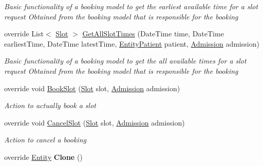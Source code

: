 \begin{DoxyCompactItemize}
\begin{DoxyCompactList}\small\item\em Basic functionality of a booking model to get the earliest available time for a slot request Obtained from the booking model that is responsible for the booking \end{DoxyCompactList}\item 
override List$<$ \hyperlink{class_general_health_care_elements_1_1_booking_models_1_1_slot}{Slot} $>$ \hyperlink{class_general_health_care_elements_1_1_booking_models_1_1_entity_multiple_booking_waiting_list_schedule_aef414867a83fb4397a0fd8d283d0aa21}{Get\+All\+Slot\+Times} (Date\+Time time, Date\+Time earliest\+Time, Date\+Time latest\+Time, \hyperlink{class_general_health_care_elements_1_1_entities_1_1_entity_patient}{Entity\+Patient} patient, \hyperlink{class_general_health_care_elements_1_1_treatment_admission_types_1_1_admission}{Admission} admission)
\begin{DoxyCompactList}\small\item\em Basic functionality of a booking model to get the all available times for a slot request Obtained from the booking model that is responsible for the booking \end{DoxyCompactList}\item 
override void \hyperlink{class_general_health_care_elements_1_1_booking_models_1_1_entity_multiple_booking_waiting_list_schedule_ab6a814da70473ad68a6904e97bf8c45c}{Book\+Slot} (\hyperlink{class_general_health_care_elements_1_1_booking_models_1_1_slot}{Slot} slot, \hyperlink{class_general_health_care_elements_1_1_treatment_admission_types_1_1_admission}{Admission} admission)
\begin{DoxyCompactList}\small\item\em Action to actually book a slot \end{DoxyCompactList}\item 
override void \hyperlink{class_general_health_care_elements_1_1_booking_models_1_1_entity_multiple_booking_waiting_list_schedule_a1795b97a285b4918eb1890ccacc7c82d}{Cancel\+Slot} (\hyperlink{class_general_health_care_elements_1_1_booking_models_1_1_slot}{Slot} slot, \hyperlink{class_general_health_care_elements_1_1_treatment_admission_types_1_1_admission}{Admission} admission)
\begin{DoxyCompactList}\small\item\em Action to cancel a booking \end{DoxyCompactList}\item 
override \hyperlink{class_simulation_core_1_1_h_c_c_m_elements_1_1_entity}{Entity} {\bfseries Clone} ()\hypertarget{class_general_health_care_elements_1_1_booking_models_1_1_entity_multiple_booking_waiting_list_schedule_ad0e72176ad9fbd3ed1e05df3669203aa}{}\label{class_general_health_care_elements_1_1_booking_models_1_1_entity_multiple_booking_waiting_list_schedule_ad0e72176ad9fbd3ed1e05df3669203aa}

\end{DoxyCompactItemize}
